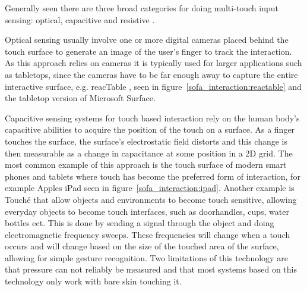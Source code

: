 Generally seen there are three broad categories for doing multi-touch input sensing: optical, capacitive and resistive \citep{rosenberg2009unmousepad}.

Optical sensing usually involve one or more digital cameras placed behind the touch surface to generate an image of the user's finger to track the interaction.
As this approach relies on cameras it is typically used for larger applications such as tabletops, since the cameras have to be far enough away to capture the entire interactive surface, e.g. reacTable \citep{jorda2007reactable}, seen in figure~\ref{sofa_interaction:reactable} and the tabletop version of Microsoft Surface.

Capacitive sensing systems for touch based interaction rely on the human body's capacitive abilities to acquire the position of the touch on a surface. 
As a finger touches the surface, the surface's electrostatic field distorts and this change is then measurable as a change in capacitance at some position in a 2D grid.
The most common example of this approach is the touch surface of modern smart phones and tablets where touch has become the preferred form of interaction, for example Apples iPad seen in figure~\ref{sofa_interaction:ipad}.
Another example is Touch\'e \citep{sato2012touche} that allow objects and environments to become touch sensitive, allowing everyday objects to become touch interfaces, such as doorhandles, cups, water bottles ect.
This is done by sending a signal through the object and doing electromagnetic frequency sweeps. 
These frequencies will change when a touch occurs and will change based on the size of the touched area of the surface, allowing for simple gesture recognition.
Two limitations of this technology are that pressure can not reliably be measured and that most systems based on this technology only work with bare skin touching it.    

